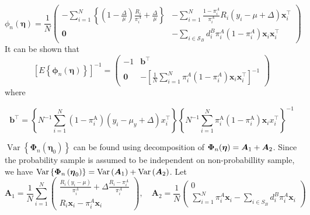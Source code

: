 \documentclass[
  letterpaper,
  DIV=11,
  numbers=noendperiod]{scrreprt}
\begin{document}
\[
\phi_n(\boldsymbol{\eta})=\frac{1}{N}\left(\begin{array}{cc}
-\sum_{i=1}^N\left\{\left(1-\frac{\Delta}{\mu}\right) \frac{R_i}{\pi_i^A}+\frac{\Delta}{\mu}\right\} & -\sum_{i=1}^N \frac{1-\pi_i^A}{\pi_i^A} R_i\left(y_i-\mu+\Delta\right) \boldsymbol{x}_i^{\top} \\
\mathbf{0} & -\sum_{i \in \mathcal{S}_B} d_i^B \pi_i^A\left(1-\pi_i^A\right) \boldsymbol{x}_i \boldsymbol{x}_i^{\top}
\end{array}\right)
\] It can be shown that \[
\left[E\left\{\boldsymbol{\phi}_n(\boldsymbol{\eta})\right\}\right]^{-1}=\left(\begin{array}{cc}
-1 &  \mathbf{b}^{\top} \\
\mathbf{0} & -\left[\frac{1}{N} \sum_{i=1}^N \pi_i^A\left(1-\pi_i^A\right) \boldsymbol{x}_i \boldsymbol{x}_i^{\top}\right]^{-1}
\end{array}\right)
\] where

\[
\mathbf{b}^{\top} = 
\left\{N^{-1} \sum_{i=1}^N\left(1-\pi_i^{\mathrm{A}}\right) \left(y_i-\mu_y + \Delta\right) x_i^{\top}\right\}\left\{N^{-1} \sum_{i=1}^N \pi_i^{\mathrm{A}}\left(1-\pi_i^{\mathrm{A}}\right) \boldsymbol{x}_i x_i^{\top}\right\}^{-1}
\]

\(\operatorname{Var}\left\{\boldsymbol{\Phi}_n\left(\boldsymbol{\eta}_0\right)\right\}\)
can be found using decomposition of
\(\boldsymbol{\Phi}_n(\boldsymbol{\eta}) = \boldsymbol{A}_1 + \boldsymbol{A}_2\). Since the probability
sample is assumed to be independent on non-probabillity sample, we have
\(\operatorname{Var}\left\{\boldsymbol{\Phi}_n\left(\boldsymbol{\eta}_0\right)\right\} = \operatorname{Var}\left(\boldsymbol{A}_1\right) + \operatorname{Var}\left(\boldsymbol{A}_2\right)\).
Let \[
\mathbf{A}_1=\frac{1}{N} \sum_{i=1}^N\left(\begin{array}{c}
\frac{R_i\left(y_i-\mu\right)}{\pi_i^A}+\Delta \frac{R_i-\pi_i^A}{\pi_i^A} \\
R_i \boldsymbol{x}_i-\pi_i^A \boldsymbol{x}_i
\end{array}\right), \quad \mathbf{A}_2=\frac{1}{N}\left(\begin{array}{c}
0 \\
\sum_{i=1}^N \pi_i^A \boldsymbol{x}_i-\sum_{i \in S_B} d_i^B \pi_i^A \boldsymbol{x}_i
\end{array}\right)
\]
\end{document}
